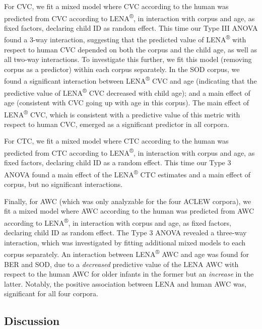 \documentclass[english,floatsintext,man]{apa6}
\begin{document}
For CVC, we fit a mixed model where CVC according to the human was
predicted from CVC according to LENA\textsuperscript{®}, in interaction
with corpus and age, as fixed factors, declaring child ID as random
effect. This time our Type III ANOVA found a 3-way interaction,
suggesting that the predicted value of LENA\textsuperscript{®} with
respect to human CVC depended on both the corpus and the child age, as
well as all two-way interactions. To investigate this further, we fit
this model (removing corpus as a predictor) within each corpus
separately. In the SOD corpus, we found a significant interaction
between LENA\textsuperscript{®} CVC and age (indicating that the
predictive value of LENA\textsuperscript{®} CVC decreased with child
age); and a main effect of age (consistent with CVC going up with age in
this corpus). The main effect of LENA\textsuperscript{®} CVC, which is
consistent with a predictive value of this metric with respect to human
CVC, emerged as a significant predictor in all corpora.

For CTC, we fit a mixed model where CTC according to the human was
predicted from CTC according to LENA\textsuperscript{®}, in interaction
with corpus and age, as fixed factors, declaring child ID as a random
effect. This time our Type 3 ANOVA found a main effect of the
LENA\textsuperscript{®} CTC estimates and a main effect of corpus, but
no significant interactions.

Finally, for AWC (which was only analyzable for the four ACLEW corpora),
we fit a mixed model where AWC according to the human was predicted from
AWC according to LENA\textsuperscript{®}, in interaction with corpus and
age, as fixed factors, declaring child ID as random effect. The Type 3
ANOVA revealed a three-way interaction, which was investigated by
fitting additional mixed models to each corpus separately. An
interaction between LENA\textsuperscript{®} AWC and age was found for
BER and SOD, due to a \emph{decreased} predictive value of the LENA AWC
with respect to the human AWC for older infants in the former but an
\emph{increase} in the latter. Notably, the positive association between
LENA and human AWC was, significant for all four corpora.

\subsection{Discussion}\label{discussion}
\end{document}
